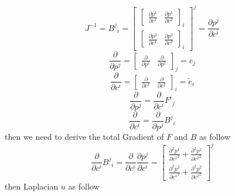 \[
    J^{-1}=B^j{}_i{}=
    \left[\begin{array}{cc}
            \left[\begin{array}{ll}
                          \frac{\partial p^1}{\partial c^1}
                           &
                          \frac{\partial p^1}{\partial c^2}
                      \end{array}\right]_{i}
            \\
            \left[\begin{array}{ll}
                          \frac{\partial p^2}{\partial c^1}
                           &
                          \frac{\partial p^2}{\partial c^2}
                      \end{array}\right]_{i}
        \end{array}\right]^{j}
    =\frac{\partial p^j}{\partial c^i}
\]
\[
    \frac{\partial}{\partial p^j}=
    \left[\begin{array}{ll}
            \frac{\partial }{\partial p^1}
             &
            \frac{\partial }{\partial p^2}
        \end{array}\right]_{j}
    =
    e_j
\]
\[
    \frac{\partial}{\partial c^i}=
    \left[\begin{array}{ll}
            \frac{\partial }{\partial c^1}
             &
            \frac{\partial }{\partial c^2}
        \end{array}\right]_{i}
    =
    \widetilde{e}_i
\]
\[
    \frac{\partial}{\partial p^j}=\frac{\partial}{\partial c^i}F^i{}_j{}
\]
\[
    \frac{\partial}{\partial c^i}=\frac{\partial}{\partial p^j}B^j{}_i{}
\]
then we need to derive the total Gradient of \(F\) and \(B\) as follow
\[
    \frac{\partial}{\partial c^i}B^j{}_i{}=
    \frac{\partial}{\partial c^i}\frac{\partial p^j}{\partial c^i}=
    \left[\begin{array}{cc}
            \frac{\partial^2 p^1}{\partial {c^1}^2}
            +
            \frac{\partial^2 p^1}{\partial {c^2}^2}
            \\
            \frac{\partial^2 p^2}{\partial {c^1}^2}
            +
            \frac{\partial^2 p^2}{\partial {c^2}^2}
        \end{array}\right]^{j}
\]
then Laplacian \(u\) as follow
